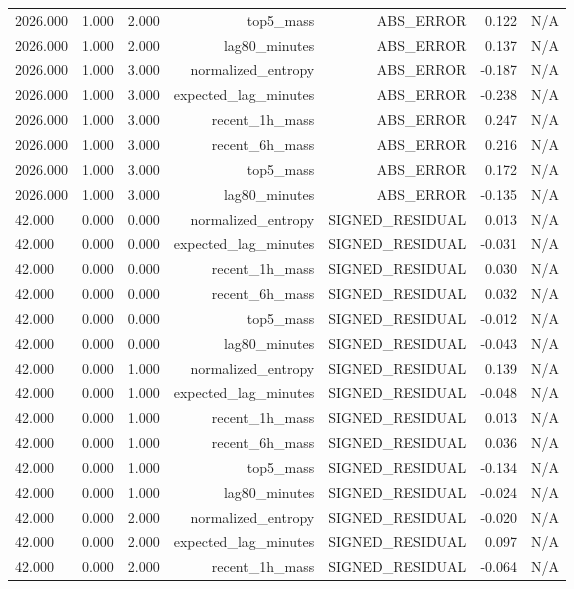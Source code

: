 \begin{table}[h!]
\begin{tabular}{lrrrrrr}
2026.000 & 1.000 & 2.000 & top5\_mass & ABS\_ERROR & 0.122 & N/A \\
2026.000 & 1.000 & 2.000 & lag80\_minutes & ABS\_ERROR & 0.137 & N/A \\
2026.000 & 1.000 & 3.000 & normalized\_entropy & ABS\_ERROR & -0.187 & N/A \\
2026.000 & 1.000 & 3.000 & expected\_lag\_minutes & ABS\_ERROR & -0.238 & N/A \\
2026.000 & 1.000 & 3.000 & recent\_1h\_mass & ABS\_ERROR & 0.247 & N/A \\
2026.000 & 1.000 & 3.000 & recent\_6h\_mass & ABS\_ERROR & 0.216 & N/A \\
2026.000 & 1.000 & 3.000 & top5\_mass & ABS\_ERROR & 0.172 & N/A \\
2026.000 & 1.000 & 3.000 & lag80\_minutes & ABS\_ERROR & -0.135 & N/A \\
42.000 & 0.000 & 0.000 & normalized\_entropy & SIGNED\_RESIDUAL & 0.013 & N/A \\
42.000 & 0.000 & 0.000 & expected\_lag\_minutes & SIGNED\_RESIDUAL & -0.031 & N/A \\
42.000 & 0.000 & 0.000 & recent\_1h\_mass & SIGNED\_RESIDUAL & 0.030 & N/A \\
42.000 & 0.000 & 0.000 & recent\_6h\_mass & SIGNED\_RESIDUAL & 0.032 & N/A \\
42.000 & 0.000 & 0.000 & top5\_mass & SIGNED\_RESIDUAL & -0.012 & N/A \\
42.000 & 0.000 & 0.000 & lag80\_minutes & SIGNED\_RESIDUAL & -0.043 & N/A \\
42.000 & 0.000 & 1.000 & normalized\_entropy & SIGNED\_RESIDUAL & 0.139 & N/A \\
42.000 & 0.000 & 1.000 & expected\_lag\_minutes & SIGNED\_RESIDUAL & -0.048 & N/A \\
42.000 & 0.000 & 1.000 & recent\_1h\_mass & SIGNED\_RESIDUAL & 0.013 & N/A \\
42.000 & 0.000 & 1.000 & recent\_6h\_mass & SIGNED\_RESIDUAL & 0.036 & N/A \\
42.000 & 0.000 & 1.000 & top5\_mass & SIGNED\_RESIDUAL & -0.134 & N/A \\
42.000 & 0.000 & 1.000 & lag80\_minutes & SIGNED\_RESIDUAL & -0.024 & N/A \\
42.000 & 0.000 & 2.000 & normalized\_entropy & SIGNED\_RESIDUAL & -0.020 & N/A \\
42.000 & 0.000 & 2.000 & expected\_lag\_minutes & SIGNED\_RESIDUAL & 0.097 & N/A \\
42.000 & 0.000 & 2.000 & recent\_1h\_mass & SIGNED\_RESIDUAL & -0.064 & N/A \\

\end{tabular}
\end{table}

